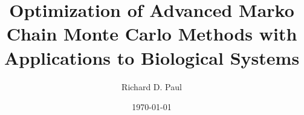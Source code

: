 \documentclass[serif,aspectratio=169]{beamer}
\title{Optimization of Advanced Marko Chain Monte Carlo Methods with Applications to Biological Systems}
\subtitle{}
\author{Richard D. Paul}
\institute[]{Forschungszentrum J\"ulich}
\date{\today}
\begin{document}
    \frame{\titlepage}
    
    
    \begin{frame}
        \tiny
	
	
    \end{frame}
\end{document}
